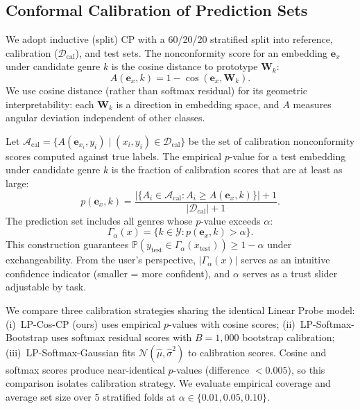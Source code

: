 \subsection{Conformal Calibration of Prediction Sets}

We adopt inductive (split) CP with a 60/20/20 stratified split into reference,
calibration ($\mathcal{D}_{\text{cal}}$), and test sets. The nonconformity score
for an embedding $\mathbf{e}_x$ under candidate genre $k$ is the cosine distance
to prototype $\mathbf{W}_k$:
\begin{equation}
  A(\mathbf{e}_x, k) = 1 - \cos(\mathbf{e}_x, \mathbf{W}_k).
  \label{eq:lp_score}
\end{equation}
We use cosine distance (rather than softmax residual) for its geometric
interpretability: each $\mathbf{W}_k$ is a direction in embedding space, and
$A$ measures angular deviation independent of other classes.

Let $\mathcal{A}_{\text{cal}} = \{ A(\mathbf{e}_{x_i}, y_i) \mid (x_i, y_i) \in
\mathcal{D}_{\text{cal}} \}$ be the set of calibration nonconformity scores
computed against true labels. The empirical $p$-value for a test embedding under
candidate genre $k$ is the fraction of calibration scores that are at least as
large:
\begin{equation}
  p(\mathbf{e}_x, k) = \frac{
    |\{ A_i \in \mathcal{A}_{\text{cal}} : A_i \geq A(\mathbf{e}_x, k) \}| + 1
  }{
    |\mathcal{D}_{\text{cal}}| + 1
  }.
  \label{eq:pvalue}
\end{equation}
The prediction set includes all genres whose $p$-value exceeds $\alpha$:
\begin{equation}
  \Gamma_{\alpha}(x) = \{ k \in \mathcal{Y} : p(\mathbf{e}_x, k) > \alpha \}.
  \label{eq:prediction_set}
\end{equation}
This construction guarantees $\mathbb{P}(y_{\text{test}} \in
\Gamma_{\alpha}(x_{\text{test}})) \geq 1 - \alpha$ under exchangeability. From
the user's perspective, $|\Gamma_{\alpha}(x)|$ serves as an intuitive confidence
indicator (smaller = more confident), and $\alpha$ serves as a trust slider
adjustable by task.

We compare three calibration strategies sharing the identical Linear Probe
model: (i)~LP-Cos-CP (ours) uses empirical $p$-values with cosine scores;
(ii)~LP-Softmax-Bootstrap uses softmax residual scores with $B=1{,}000$
bootstrap calibration; (iii)~LP-Softmax-Gaussian fits
$\mathcal{N}(\hat{\mu}, \hat{\sigma}^2)$ to calibration scores. Cosine and
softmax scores produce near-identical $p$-values (difference $< 0.005$), so
this comparison isolates calibration strategy. We evaluate empirical coverage
and average set size over 5 stratified folds at $\alpha \in \{0.01, 0.05,
0.10\}$.
